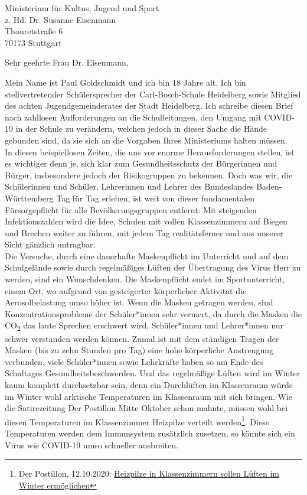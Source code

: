 \documentclass[
	fontsize=12pt,
	parskip=full,
	paper=A4,	
	fromalign=right,
	fromemail=true,
	version=last,
]{scrlttr2}
\begin{document}
\begin{letter}{
	Ministerium für Kultus, Jugend und Sport\\
	z. Hd. Dr. Susanne Eisenmann\\
	Thouretstraße 6\\
	70173 Stuttgart 
}
	
\opening{Sehr geehrte Frau Dr. Eisenmann,}

Mein Name ist Paul Goldschmidt und ich bin 18 Jahre alt. Ich bin stellvertretender Schülersprecher der Carl-Bosch-Schule Heidelberg sowie Mitglied des achten Jugendgemeinderates der Stadt Heidelberg. Ich schreibe diesen Brief nach zahllosen Aufforderungen an die Schulleitungen, den Umgang mit COVID-19 in der Schule zu verändern, welchen jedoch in dieser Sache die Hände gebunden sind, da sie sich an die Vorgaben Ihres Ministeriums halten müssen.\\
In diesen beispiellosen Zeiten, die uns vor enorme Herausforderungen stellen, ist es wichtiger denn je, sich klar zum Gesundheitsschutz der Bürgerinnen und Bürger, insbesondere jedoch der Risikogruppen zu bekennen. Doch was wir, die Schülerinnen und Schüler, Lehrerinnen und Lehrer des Bundeslandes Baden-Württemberg Tag für Tag erleben, ist weit von dieser fundamentalen Fürsorgepflicht für alle Bevölkerungsgruppen entfernt: Mit steigenden Infektionszahlen wird die Idee, Schulen mit vollen Klassenzimmern auf Biegen und Brechen weiter zu führen, mit jedem Tag realitätsferner und aus unserer Sicht gänzlich untragbar. \\
Die Versuche, durch eine dauerhafte Maskenpflicht im Unterricht und auf dem Schulgelände sowie durch regelmäßiges Lüften der Übertragung des Virus Herr zu werden, sind ein Wunschdenken. Die Maskenpflicht endet im Sportunterricht, einem Ort, wo aufgrund von gesteigerter körperlicher Aktivität die Aerosolbelastung umso höher ist. Wenn die Masken getragen werden, sind Konzentrationsprobleme der Schüler*innen sehr vermert, da durch die Masken die CO\textsubscript{2} das laute Sprechen erschwert wird, Schüler*innen und Lehrer*innen nur schwer verstanden werden können. Zumal ist mit dem ständigen Tragen der Masken (bis zu zehn Stunden pro Tag) eine hohe körperliche Anstrengung verbunden, viele Schüler*innen sowie Lehrkräfte haben so am Ende des Schultages Gesundheitsbeschwerden. Und das regelmäßige Lüften wird im Winter kaum komplett durchsetzbar sein, denn ein Durchlüften im Klassenraum würde im Winter wohl arktische Temperaturen im Klassenraum mit sich bringen. Wie die Satirezeitung \glqq Der Postillon\grqq{} Mitte Oktober schon mahnte, müssen wohl bei diesen Temperaturen im Klassenzimmer Heizpilze verteilt werden\footnote{Der Postillon, 12.10.2020: \glqq \href{https://www.der-postillon.com/2020/10/heizpilze.html}{\color{blue}Heizpilze in Klassenzimmern sollen Lüften im Winter ermöglichen\grqq}}. Diese Temperaturen werden dem Immunsystem zusätzlich zusetzen, so könnte sich ein Virus wie COVID-19 umso schneller ausbreiten. \\


\end{letter}
\end{document}
